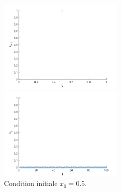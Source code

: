 \documentclass[a4paper, 12pt]{report}
\begin{document}
\begin{figure}[H]
    \centering
    \begin{minipage}[t]{6cm}
        \centering
        \includegraphics[width=6cm]{images/0dot5_x_i_x_i_plus_1.png}
    \end{minipage}\hspace{1cm}
    \begin{minipage}[t]{6cm}
        \centering
        \includegraphics[width=6cm]{images/0dot5_i_x_i.png}
    \end{minipage}
    \caption{Condition initiale $x_0 = 0.5$.}
\end{figure}

\end{document}
